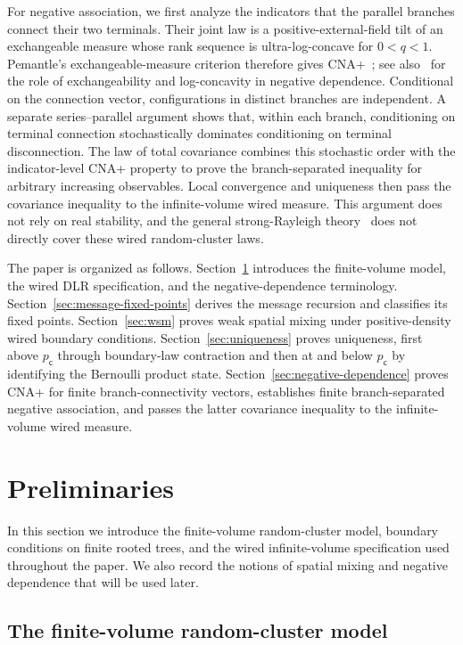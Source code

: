 \documentclass[11pt]{amsart}
\theoremstyle{plain}
\theoremstyle{definition}
\theoremstyle{remark}
\newcommand{\pc}{p_{\mathsf{c}}}
\begin{document}
For negative association, we first analyze the indicators that the parallel branches connect their two terminals. Their joint law is a positive-external-field tilt of an exchangeable measure whose rank sequence is ultra-log-concave for $0<q<1$. Pemantle's exchangeable-measure criterion therefore gives CNA+~\cite{pemantle2000towards}; see also~\cite{kahnNeiman2010negative} for the role of exchangeability and log-concavity in negative dependence. Conditional on the connection vector, configurations in distinct branches are independent. A separate series--parallel argument shows that, within each branch, conditioning on terminal connection stochastically dominates conditioning on terminal disconnection. The law of total covariance combines this stochastic order with the indicator-level CNA+ property to prove the branch-separated inequality for arbitrary increasing observables. Local convergence and uniqueness then pass the covariance inequality to the infinite-volume wired measure. This argument does not rely on real stability, and the general strong-Rayleigh theory~\cite{borceaBrandenLiggett2009} does not directly cover these wired random-cluster laws.

The paper is organized as follows. Section~\ref{sec:model} introduces the finite-volume model, the wired DLR specification, and the negative-dependence terminology. Section~\ref{sec:message-fixed-points} derives the message recursion and classifies its fixed points. Section~\ref{sec:wsm} proves weak spatial mixing under positive-density wired boundary conditions. Section~\ref{sec:uniqueness} proves uniqueness, first above $\pc$ through boundary-law contraction and then at and below $\pc$ by identifying the Bernoulli product state. Section~\ref{sec:negative-dependence} proves CNA+ for finite branch-connectivity vectors, establishes finite branch-separated negative association, and passes the latter covariance inequality to the infinite-volume wired measure.

\section{Preliminaries}
\label{sec:model}

In this section we introduce the finite-volume random-cluster model, boundary conditions on finite rooted trees, and the wired infinite-volume specification used throughout the paper. We also record the notions of spatial mixing and negative dependence that will be used later.

\subsection{The finite-volume random-cluster model}
\end{document}
